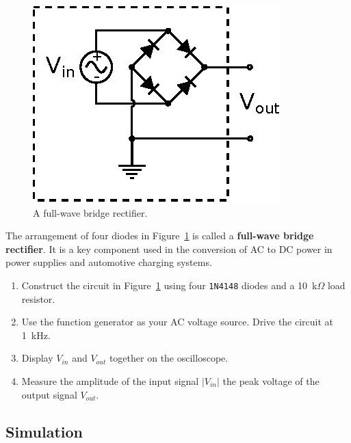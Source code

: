 \documentclass[11pt]{article}
\begin{document}
\begin{figure}[h]
\centering
\includegraphics{bridgerectifier.eps}
\caption{A full-wave bridge rectifier.}
\label{fig:bridgerectifier}
\end{figure}
The arrangement of four diodes in Figure~\ref{fig:bridgerectifier} is
called a \textbf{full-wave bridge rectifier}. It is a key component
used in the conversion of AC to DC power in power supplies and
automotive charging systems. 

\begin{enumerate}
\item Construct the circuit in
  Figure~\ref{fig:bridgerectifier} using four \texttt{1N4148} diodes
  and a 10~k$\Omega$ load resistor.

\item Use the function generator as your AC voltage source. Drive the
  circuit at 1~kHz. 
  
\item Display $V_{in}$ and $V_{out}$ together on the oscilloscope.

\item Measure the amplitude of the input signal $|V_{in}|$ the peak
  voltage of the output signal $V_{out}$.
\end{enumerate}

\subsection*{Simulation}
\end{document}
